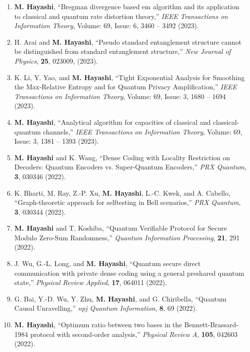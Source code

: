 \documentclass[a4paper,12pt,oneside]{article}
\begin{document}
\begin{enumerate}
\item
\textbf{M. Hayashi},
``Bregman divergence based em algorithm and its application to classical and quantum rate distortion theory,''
{\em IEEE Transactions on Information Theory},
Volume: 69, Issue: 6, 3460 – 3492 (2023).

\item
H. Arai and \textbf{M. Hayashi},
``Pseudo standard entanglement structure cannot be distinguished from standard entanglement structure,''
{\em New Journal of Physics},
{\bf 25}, 023009, (2023).

\item
K. Li, Y. Yao, and \textbf{M. Hayashi}, 
``Tight Exponential Analysis for Smoothing the Max-Relative Entropy and for Quantum Privacy Amplification,''
{\em IEEE Transactions on Information Theory},
Volume: 69, Issue: 3, 1680 – 1694 (2023).

\item
\textbf{M. Hayashi},
``Analytical algorithm for capacities of classical and classical-quantum channels,''
{\em IEEE Transactions on Information Theory},
Volume: 69, Issue: 3, 1381 – 1393 (2023).

\item
\textbf{M. Hayashi} and K. Wang,
``Dense Coding with Locality Restriction on Decoders: Quantum Encoders vs. Super-Quantum Encoders,''
{\em PRX Quantum},
{\bf 3}, 030346 (2022).

\item
K. Bharti, M. Ray, Z.-P. Xu, \textbf{M. Hayashi}, L.-C. Kwek, and A. Cabello,
``Graph-theoretic approach for selftesting in Bell scenarios,''
{\em PRX Quantum},
{\bf 3}, 030344 (2022).

\item
\textbf{M. Hayashi} and T. Koshiba,
``Quantum Verifiable Protocol for Secure Modulo Zero-Sum Randomness,''
{\em Quantum Information Processing},
{\bf 21}, 291 (2022).

\item
J. Wu, G.-L. Long, and \textbf{M. Hayashi},
``Quantum secure direct communication with private dense coding using a general preshared quantum state,''
{\em Physical Review Applied},
{\bf 17}, 064011 (2022).

\item
G. Bai, Y.-D. Wu, Y. Zhu, \textbf{M. Hayashi}, and G. Chiribella,
``Quantum Causal Unravelling,''
{\em npj Quantum Information},
{\bf 8}, 69 (2022).

\item
\textbf{M. Hayashi},
``Optimum ratio between two bases in the Bennett-Brassard-1984 protocol with second-order analysis,''
{\em Physical Review A},
{\bf 105}, 042603 (2022).


\end{enumerate}
\end{document}
